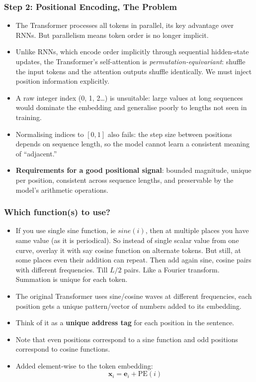 \begin{frame}[fragile]\frametitle{Step 2: Positional Encoding, The Problem}
\begin{itemize}
\item The Transformer processes all tokens in parallel, its key
  advantage over RNNs. But parallelism means token order is no
  longer implicit.
\item Unlike RNNs, which encode order implicitly through sequential hidden-state
  updates, the Transformer's self-attention is \emph{permutation-equivariant}:
  shuffle the input tokens and the attention outputs shuffle identically.
  We must inject position information explicitly.
\item A raw integer index (0, 1, 2\ldots) is unsuitable: large values at long
  sequences would dominate the embedding and generalise poorly to lengths
  not seen in training.
\item Normalising indices to $[0,1]$ also fails: the step size
  between positions depends on sequence length, so the model
  cannot learn a consistent meaning of ``adjacent.''
\item \textbf{Requirements for a good positional signal}: bounded
  magnitude, unique per position, consistent across sequence lengths,
  and preservable by the model's arithmetic operations.
\end{itemize}


\end{frame}

\begin{frame}[fragile]\frametitle{Which function(s) to use?}
\begin{itemize}
\item If you use single sine function, ie $sine(i)$, then at multiple places you have same value (as it is periodical). So instead of single scalar value from one curve, overlay it with say cosine function on alternate tokens. But still, at some places even their addition can repeat. Then add again sine, cosine pairs with different frequencies. Till $L/2$ pairs. Like a Fourier transform. Summation is unique for each token.
\item The original Transformer uses sine/cosine waves at different frequencies,  each position gets a unique pattern/vector of numbers added to its embedding.
\item Think of it as a \textbf{unique address tag} for each position in the sentence.
\item  Note that even positions correspond to a sine function and odd positions correspond to cosine functions.
\item Added element-wise to the token embedding:
\[
  \mathbf{x}_i = \mathbf{e}_i + \text{PE}(i)
\]
\end{itemize}


\end{frame}

